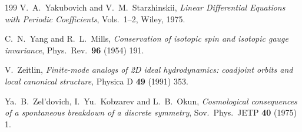 \begin{thebibliography}{199}
 V.~A.~Yakubovich and V.~M.~Starzhinskii, \emph{Linear Differential Equations with Periodic Coefficients}, Vols.~1--2, Wiley, 1975.

 C.~N.~Yang and R.~L.~Mills, \emph{Conservation of isotopic spin and isotopic gauge invariance}, Phys.~Rev.~\textbf{96} (1954) 191.

 V.~Zeitlin, \emph{Finite-mode analogs of 2D ideal hydrodynamics: coadjoint orbits and local canonical structure}, Physica D \textbf{49} (1991) 353.

 Ya.~B.~Zel'dovich, I.~Yu.~Kobzarev and L.~B.~Okun, \emph{Cosmological consequences of a spontaneous breakdown of a discrete symmetry},
Sov.~Phys.~JETP \textbf{40} (1975) 1.

\end{thebibliography}
